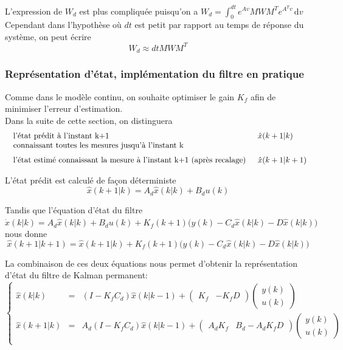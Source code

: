 \documentclass[12pt,twoside,a4paper]{article}
\begin{document}
\noindent L'expression de $W_d$ est plus compliquée puisqu'on a $W_d = \int_0^{dt}e^{Av}MWM^Te^{A^T v} \, \mathrm{d}v$ \\
Cependant dans l'hypothèse où $dt$ est petit par rapport au temps de réponse du système, on peut écrire
$$ W_d \approx dtMWM^T$$

\subsubsection{Représentation d'état, implémentation du filtre en pratique}


Comme dans le modèle continu, on souhaite optimiser le gain $K_{f}$ afin de minimiser l'erreur d'estimation. \\
Dans la suite de cette section, on distinguera
$$
\begin{array}{ll}
	\begin{array}[t]{l}
	\text{l'état prédit à l'instant k+1}\\
	\text{connaissant toutes les mesures jusqu'à l'instant k}
	\end{array} & \hat x(k+1|k) \\

	\begin{array}{l}
	\text{l'état estimé connaissant la mesure à l'instant k+1 (après recalage)}
	\end{array} & \hat x(k+1|k+1) \rule{0pt}{15pt}
\end{array}
$$

\noindent L'état prédit est calculé de fa\c con déterministe
$$ \hat x(k+1|k) = A_{d} \hat x (k|k) +B_du(k)$$

\noindent Tandis que l'équation d'état du filtre
$$ \hat{\dot{x}}(k|k) = A_d\hat{x}(k|k)+B_du(k)+K_f(k+1)\big(y(k) - C_{d} \hat x(k|k) - D \hat x(k|k) \big) $$
\indent nous donne
$$ \hat x(k+1|k+1) = \hat x(k+1|k)+ K_{f}(k+1)\big(y(k) - C_{d} \hat x(k|k) - D \hat x(k|k) \big)$$

La combinaison de ces deux équations nous permet d'obtenir la représentation d'état du filtre de Kalman permanent:
$$
\boxed{
\left\{
\begin{array}{lll}
\hat x(k|k) &=& (I-K_f C_d)\hat x(k|k-1)+
	\begin{pmatrix} K_f & -K_f D \end{pmatrix}
	\begin{pmatrix} y(k) \\ u(k) \end{pmatrix} \\
\hat x( k+1|k) &=& A_d(I-K_f C_d) \hat x (k|k-1) +
	\begin{pmatrix} A_d K_f & B_d-A_dK_fD \end{pmatrix}
	\begin{pmatrix} y(k) \\ u(k)\end{pmatrix} \\
\end{array}
\right.}
$$
\end{document}
